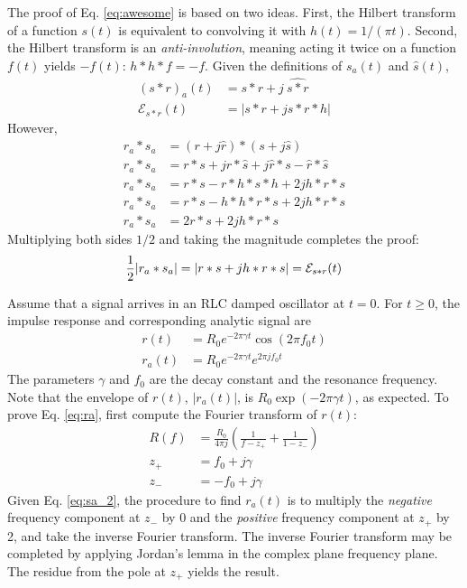 \documentclass[amsmath,amssymb,aps,prd,10pt,twocolumn,showkeys]{revtex4}
\begin{document}
The proof of Eq. \ref{eq:awesome} is based on two ideas.  First, the Hilbert transform of a function $s(t)$ is equivalent to convolving it with $h(t) = 1/(\pi t)$.  Second, the Hilbert transform is an \textit{anti-involution}, meaning acting it twice on a function $f(t)$ yields $-f(t)$: $h * h * f = -f$.  Given the definitions of $s_a(t)$ and $\hat{s}(t)$,
\begin{align}
(s * r)_a (t) &= s * r + j ~ \widehat{s*r} \\
\mathcal{E}_{s * r}(t) &= | s * r + j s * r * h|
\end{align}
However,
\begin{align}
r_a * s_a &= (r + j \hat{r}) * (s + j \hat{s}) \\
r_a * s_a &= r * s + j r * \hat{s} + j \hat{r} * s - \hat{r} * \hat{s} \\
r_a * s_a &= r * s - r * h * s * h + 2 j h * r * s \\
r_a * s_a &= r * s - h * h * r * s + 2 j h * r * s \\
r_a * s_a &= 2 r * s + 2 j h * r * s
\end{align}
Multiplying both sides $1/2$ and taking the magnitude completes the proof:
\begin{equation}
\frac{1}{2} |r_a * s_a| = |r * s + j h * r * s| = \mathcal{E}_{s * r}(t) \\
\end{equation}

Assume that a signal arrives in an RLC damped oscillator at $t=0$.  For $t\geq 0$, the impulse response and corresponding analytic signal are
\begin{align}
r(t) &= R_0 e^{-2 \pi \gamma t} \cos(2\pi f_0 t) \label{eq:r} \\
r_a(t) &= R_0 e^{-2 \pi \gamma t} e^{2\pi j f_0 t} \label{eq:ra}
\end{align}
The parameters $\gamma$ and $f_0$ are the decay constant and the resonance frequency.  Note that the envelope of $r(t)$, $|r_a(t)|$, is $R_0 \exp(-2 \pi \gamma t)$, as expected.  To prove Eq. \ref{eq:ra}, first compute the Fourier transform of $r(t)$:
\begin{align}
R(f) &= \frac{R_0}{4\pi j} \left( \frac{1}{f - z_{+}} + \frac{1}{1- z_{-}} \right) \\
z_{+} &= f_0 + j \gamma \\
z_{-} &= -f_0 + j \gamma
\end{align}
Given Eq. \ref{eq:sa_2}, the procedure to find $r_a(t)$ is to multiply the \textit{negative} frequency component at $z_{-}$ by 0 and the \textit{positive} frequency component at $z_{+}$ by 2, and take the inverse Fourier transform.  The inverse Fourier transform may be completed by applying Jordan's lemma in the complex plane frequency plane.  The residue from the pole at $z_{+}$ yields the result.
\end{document}
